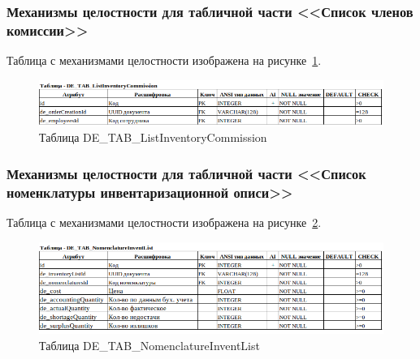 
\subsubsection{Механизмы целостности для табличной части <<Список членов комиссии>>}

Таблица с механизмами целостности изображена на рисунке~\ref{fig:Logic_DE_TAB_ListInventoryCommission}.

\begin{figure}[!h]
    \centering

    \includegraphics[width=16cm]
    {assets/database/Types/DE_TAB_ListInventoryCommission.png}

    \caption{Таблица DE\_TAB\_ListInventoryCommission}

    \label{fig:Logic_DE_TAB_ListInventoryCommission}
\end{figure}


\subsubsection{Механизмы целостности для табличной части <<Список номенклатуры инвентаризационной описи>>}

Таблица с механизмами целостности изображена на рисунке~\ref{fig:Logic_DE_TAB_NomenclatureInventList}.

\begin{figure}[!h]
    \centering

    \includegraphics[width=16cm]
    {assets/database/Types/DE_TAB_NomenclatureInventList.png}

    \caption{Таблица DE\_TAB\_NomenclatureInventList}

    \label{fig:Logic_DE_TAB_NomenclatureInventList}
\end{figure}

